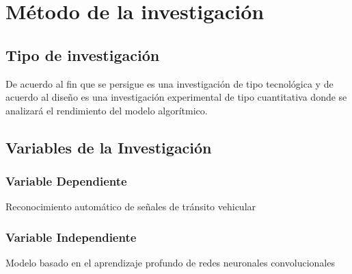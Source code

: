 \section{Método de la investigación}

\subsection{ Tipo de investigación}
	De acuerdo al fin que se persigue es una investigación de tipo tecnológica y de acuerdo al diseño es una investigación experimental de tipo cuantitativa donde se analizará el rendimiento del modelo algorítmico.

\subsection{Variables de la Investigación}
		
		\subsubsection{Variable Dependiente}
		\indent Reconocimiento automático de señales de tránsito vehicular
		\subsubsection {Variable Independiente}
		\indent Modelo basado en el aprendizaje profundo de redes neuronales convolucionales	
		
